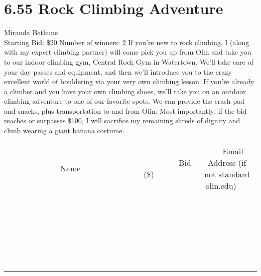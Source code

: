 \documentclass[11pt]{article}
\begin{document}
\section*{6.55 Rock Climbing Adventure}
Miranda Bethune
\\
Starting Bid: \$20
\newline
Number of winners: 2
\newline
If you're new to rock climbing, I (along with my expert climbing partner) will come pick you up from Olin and take you to our indoor climbing gym, Central Rock Gym in Watertown. We'll take care of your day passes and equipment, and then we'll introduce you to the crazy excellent world of bouldering via your very own climbing lesson. If you're already a climber and you have your own climbing shoes, we'll take you on an outdoor climbing adventure to one of our favorite spots. We can provide the crash pad and snacks, plus transportation to and from Olin. Most importantly: if the bid reaches or surpasses \$100, I will sacrifice my remaining shreds of dignity and climb wearing a giant banana costume.
\\[6ex]
\begin{tabular}{c c c}
~~~~~~~~~~~~~Name~~~~~~~~~~~~~ & ~~~~~~~~~Bid (\$)~~~~~~~~~  & ~~~Email Address (if not standard olin.edu)~~~\\
 & & \\
\hline
 & & \\
\hline
 & & \\
\hline
 & & \\
\hline
 & & \\
\hline
 & & \\
\hline
 & & \\
\hline
 & & \\
\hline
 & & \\
\hline
 & & \\
\hline
 & & \\
\hline
 & & \\
\hline
 & & \\
\hline
 & & \\
\hline
 & & \\
\hline
 & & \\
\hline
 & & \\
\hline
 & & \\
\hline
 & & \\
\hline
 & & \\
\hline
 & & \\
\hline
 & & \\
\hline
 & & \\
\hline
 & & \\
\hline
 & & \\
\hline
 & & \\
\hline
\end{tabular}
\newpage
\end{document}
